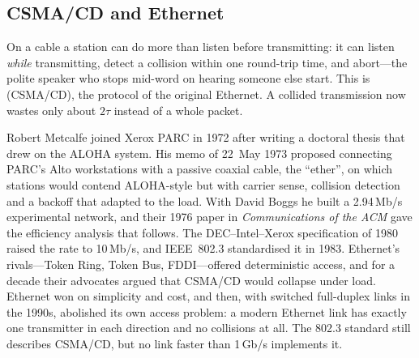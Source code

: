\subsection{CSMA/CD and Ethernet}

On a cable a station can do more than listen before transmitting: it can listen \emph{while}
transmitting, detect a collision within one round-trip time, and abort---the polite speaker who stops
mid-word on hearing someone else start. This is  (CSMA/CD), the
protocol of the original Ethernet. A collided transmission now wastes only about $2\tau$ instead of a
whole packet.


\begin{history}[Ethernet]
Robert Metcalfe joined Xerox PARC in 1972 after writing a doctoral thesis that drew on the ALOHA system. His
memo of 22~May 1973 proposed connecting PARC's Alto workstations with a passive coaxial cable, the ``ether'',
on which stations would contend ALOHA-style but with carrier sense, collision detection and a backoff that
adapted to the load. With David Boggs he built a 2.94\,Mb/s experimental network, and their 1976 paper in
\emph{Communications of the ACM} gave the efficiency analysis that follows. The DEC--Intel--Xerox
specification of 1980 raised the rate to 10\,Mb/s, and IEEE~802.3 standardised it in 1983. Ethernet's
rivals---Token Ring, Token Bus, FDDI---offered deterministic access, and for a decade their advocates argued
that CSMA/CD would collapse under load. Ethernet won on simplicity and cost, and then, with switched
full-duplex links in the 1990s, abolished its own access problem: a modern Ethernet link has exactly one
transmitter in each direction and no collisions at all. The 802.3 standard still describes CSMA/CD, but no
link faster than 1\,Gb/s implements it.
\end{history}


